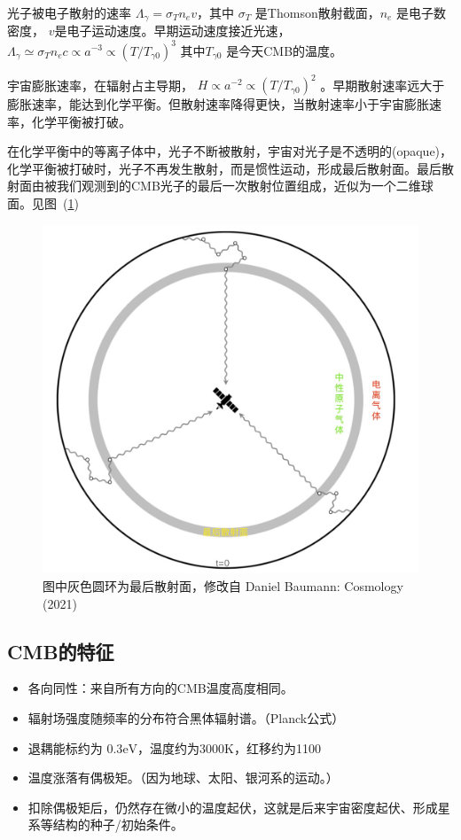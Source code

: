 \documentclass[12pt]{ctexart}
\newcommand{\reffig}[1]{图~(\ref{#1})}
\begin{document}
光子被电子散射的速率 $\Lambda_\gamma = \sigma_T n_e v$，其中 $\sigma_T$ 是Thomson散射截面，$n_e$ 是电子数密度， $v$是电子运动速度。早期运动速度接近光速，$\Lambda_\gamma \simeq \sigma_T n_e c \propto a^{-3} \propto \left(T/T_{\gamma 0}\right)^3 $ 其中$T_{\gamma 0}$ 是今天CMB的温度。

宇宙膨胀速率，在辐射占主导期， $H\propto a^{-2} \propto \left(T/T_{\gamma 0}\right)^2$ 。早期散射速率远大于膨胀速率，能达到化学平衡。但散射速率降得更快，当散射速率小于宇宙膨胀速率，化学平衡被打破。

在化学平衡中的等离子体中，光子不断被散射，宇宙对光子是不透明的(opaque)，化学平衡被打破时，光子不再发生散射，而是惯性运动，形成最后散射面。最后散射面由被我们观测到的CMB光子的最后一次散射位置组成，近似为一个二维球面。见\reffig{fig.LastScat}

\begin{figure}[!hbtp]
	\centering
	\includegraphics[width=1.0\linewidth]{lastScatter2022.jpg}
	\caption{图中灰色圆环为最后散射面，修改自 Daniel Baumann: Cosmology (2021)} \label{fig.LastScat}
\end{figure}

\subsection{CMB的特征}

\begin{itemize}
    \item 各向同性：来自所有方向的CMB温度高度相同。
    \item 辐射场强度随频率的分布符合黑体辐射谱。（Planck公式）
    \item 退耦能标约为 $0.3\mathrm{eV}$，温度约为3000K，红移约为1100
    \item 温度涨落有偶极矩。（因为地球、太阳、银河系的运动。）
    \item 扣除偶极矩后，仍然存在微小的温度起伏，这就是后来宇宙密度起伏、形成星系等结构的种子/初始条件。
\end{itemize}
\end{document}
